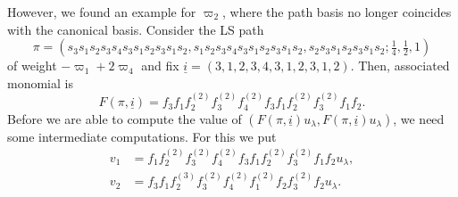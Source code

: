 \documentclass[final]{amsart}
\theoremstyle{plain}
\theoremstyle{definition}
\newcommand{\uli}{{\underline i}}
\begin{document}
However, we found an example for $\varpi_2$, where the path basis no longer coincides with the canonical basis.
Consider the LS path
\[
    \pi = (s_3 s_1 s_2 s_3 s_4 s_3 s_1 s_2 s_3 s_1 s_2, s_1 s_2 s_3 s_4 s_3 s_1 s_2 s_3 s_1 s_2, s_2 s_3 s_1 s_2 s_3 s_1 s_2; \tfrac14, \tfrac12, 1)
\]
of weight $-\varpi_1 + 2\varpi_4$ and fix $\uli = (3, 1, 2, 3, 4, 3, 1, 2, 3, 1, 2)$.
Then, associated monomial is
\[
    F(\pi, \uli) = f_3 f_1 f_2^{(2)} f_3^{(2)} f_4^{(2)} f_3 f_1 f_2^{(2)} f_3^{(2)} f_1 f_2.
\]
Before we are able to compute the value of $(F(\pi, \uli) u_\lambda, F(\pi, \uli) u_\lambda)$, we need some intermediate computations.
For this we put
\begin{align*}
    v_1 &= f_1 f_2^{(2)} f_3^{(2)} f_4^{(2)} f_3 f_1 f_2^{(2)} f_3^{(2)} f_1 f_2 u_\lambda, \\
    v_2 &= f_3 f_1 f_2^{(3)} f_3^{(2)} f_4^{(2)} f_1^{(2)} f_2 f_3^{(2)} f_2 u_\lambda.
\end{align*}
\end{document}
